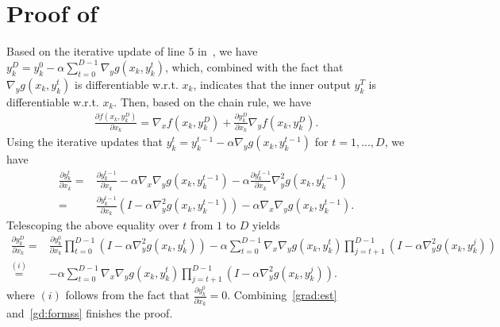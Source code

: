 \documentclass{osudissert96}
\begin{document}
\section{Proof of~ }
Based on the iterative update of  line $5$ in~, we have $y_k^D = y_k^{0}-\alpha \sum_{t=0}^{D-1}\nabla_y g(x_k,y_k^{t})$, which, combined with the fact that  $\nabla_y g(x_k,y_k^{t})$ is differentiable w.r.t. $x_k$, indicates that the inner output $y_k^T$ is differentiable w.r.t. $x_k$. Then, based on the chain rule, 
we have 
\begin{align}\label{grad:est}
\frac{\partial f(x_k,y^D_k)}{\partial x_k}= \nabla_x f(x_k,y_k^D) + \frac{\partial y_k^D}{\partial x_k}\nabla_y f(x_k,y_k^D).
\end{align}
Using the iterative updates that $y_k^t = y_k^{t-1}-\alpha \nabla_y g(x_k,y_k^{t-1}) $ for $t=1,...,D$, we have 
\begin{align*}
\frac{\partial y_k^t}{\partial x_k} =& \frac{\partial y_k^{t-1}}{\partial x_k}-\alpha \nabla_x\nabla_y g(x_k,y_k^{t-1})-\alpha\frac{\partial y_k^{t-1}}{\partial x_k} \nabla^2_y g(x_k,y_k^{t-1}) 
\\= &\frac{\partial y_k^{t-1}}{\partial x_k}(I-\alpha  \nabla^2_y g(x_k,y_k^{t-1}))-\alpha \nabla_x\nabla_y g(x_k,y_k^{t-1}).
\end{align*}
Telescoping the above equality over $t$ from $1$ to $D$ yields
\begin{align}\label{gd:formss}
\frac{\partial y_k^D}{\partial x_k} =&\frac{\partial y_k^0}{\partial x_k} \prod_{t=0}^{D-1}(I-\alpha  \nabla^2_y g(x_k,y_k^{t}))-\alpha\sum_{t=0}^{D-1}\nabla_x\nabla_y g(x_k,y_k^{t})\prod_{j=t+1}^{D-1}(I-\alpha  \nabla^2_y g(x_k,y_k^{j})) \nonumber
\\\overset{(i)}=&-\alpha\sum_{t=0}^{D-1}\nabla_x\nabla_y g(x_k,y_k^{t})\prod_{j=t+1}^{D-1}(I-\alpha  \nabla^2_y g(x_k,y_k^{j})). 
\end{align}
where $(i)$ follows from the fact that  $\frac{\partial y_k^0}{\partial x_k}=0$. 
Combining~\cref{grad:est} and~\cref{gd:formss} finishes the proof.
\end{document}
